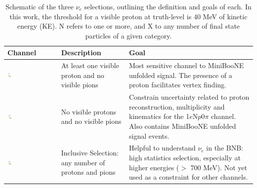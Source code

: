 \begin{table}[ht]
\caption{\label{tab:selectionsNue} Schematic of the three $\nu_e$ selections, outlining the definition and goals of each. In this work, the threshold for a visible proton at truth-level is 40 MeV of kinetic energy (KE). N refers to one or more, and X to any number of final state particles of a given category.}
\centering
\begin{tabular}{ m{} | m{}  m{}  }
Channel & Description & Goal \\
\hline
 \begin{center}\includegraphics[width=0.1\textwidth]{introduction/1eNp}\end{center}& At least one visible proton and no visible pions & Most sensitive channel to MiniBooNE unfolded signal. The presence of a proton facilitates vertex finding.\\
\hline
 \begin{center}\includegraphics[width=0.1\textwidth]{introduction/1e0pcartoon.png}\end{center}& No visible protons and no visible pions & Constrain uncertainty related to proton reconstruction, multiplicity and kinematics for the 1$e$N$p$0$\pi$ channel. Also contains MiniBooNE unfolded signal events.\\
\hline
\begin{center}\includegraphics[width=0.1\textwidth]{introduction/inclusive} \end{center} & Inclusive Selection: any number of protons and pions & Helpful to understand $\nu_e$ in the BNB: high statistics selection, especially at higher energies ($>$ 700 MeV). Not yet used as a constraint for other channels. \\
\hline
\end{tabular}
\label{tab:gt}
\end{table}



